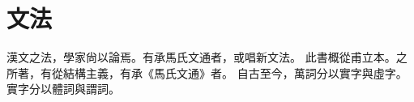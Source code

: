 \chapter*{文法}
漢文之法，學家尙以論焉。有承馬氏文通者，或唱新文法。
此書概從甫立本。\cites{Pulleyblank:2005}之所著，有從結構主義，有承《馬氏文通》者\parencites{Pulleyblank:2005}。
自古至今，萬詞分以實字與虛字\parencites{Pulleyblank:2005}。
實字分以體詞與謂詞\parencites{Pulleyblank:2005}。

